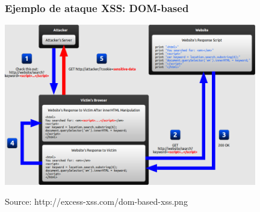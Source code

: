 
\begin{frame}
\frametitle{Ejemplo de ataque XSS: DOM-based}

\begin{center}
  \includegraphics[width=11cm]{figs/dom-based-xss}
\end{center}


\begin{flushright}
{\tiny
Source: http://excess-xss.com/dom-based-xss.png
}
\end{flushright}

\end{frame}
